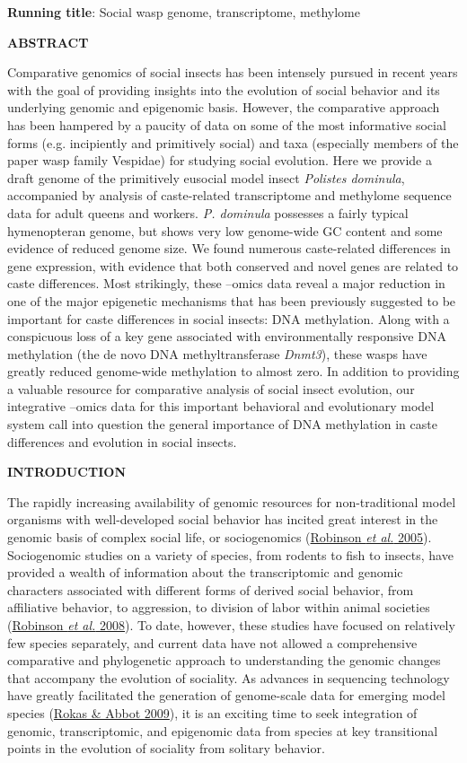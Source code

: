 \documentclass[]{article}
\begin{document}
\textbf{Running title}: Social wasp genome, transcriptome, methylome

\textbf{ABSTRACT}

Comparative genomics of social insects has been intensely pursued in
recent years with the goal of providing insights into the evolution of
social behavior and its underlying genomic and epigenomic basis.
However, the comparative approach has been hampered by a paucity of data
on some of the most informative social forms (e.g. incipiently and
primitively social) and taxa (especially members of the paper wasp
family Vespidae) for studying social evolution. Here we provide a draft
genome of the primitively eusocial model insect \emph{Polistes
dominula}, accompanied by analysis of caste-related transcriptome and
methylome sequence data for adult queens and workers. \emph{P. dominula}
possesses a fairly typical hymenopteran genome, but shows very low
genome-wide GC content and some evidence of reduced genome size. We
found numerous caste-related differences in gene expression, with
evidence that both conserved and novel genes are related to caste
differences. Most strikingly, these --omics data reveal a major
reduction in one of the major epigenetic mechanisms that has been
previously suggested to be important for caste differences in social
insects: DNA methylation. Along with a conspicuous loss of a key gene
associated with environmentally responsive DNA methylation (the de novo
DNA methyltransferase \emph{Dnmt3}), these wasps have greatly reduced
genome-wide methylation to almost zero. In addition to providing a
valuable resource for comparative analysis of social insect evolution,
our integrative --omics data for this important behavioral and
evolutionary model system call into question the general importance of
DNA methylation in caste differences and evolution in social insects.

\textbf{INTRODUCTION}

The rapidly increasing availability of genomic resources for
non-traditional model organisms with well-developed social behavior has
incited great interest in the genomic basis of complex social life, or
sociogenomics (\protect\hyperlink{ux5fENREFux5f49}{Robinson \emph{et
al.} 2005}). Sociogenomic studies on a variety of species, from rodents
to fish to insects, have provided a wealth of information about the
transcriptomic and genomic characters associated with different forms of
derived social behavior, from affiliative behavior, to aggression, to
division of labor within animal societies
(\protect\hyperlink{ux5fENREFux5f48}{Robinson \emph{et al.} 2008}). To
date, however, these studies have focused on relatively few species
separately, and current data have not allowed a comprehensive
comparative and phylogenetic approach to understanding the genomic
changes that accompany the evolution of sociality. As advances in
sequencing technology have greatly facilitated the generation of
genome-scale data for emerging model species
(\protect\hyperlink{ux5fENREFux5f50}{Rokas \& Abbot 2009}), it is an
exciting time to seek integration of genomic, transcriptomic, and
epigenomic data from species at key transitional points in the evolution
of sociality from solitary behavior.
\end{document}
